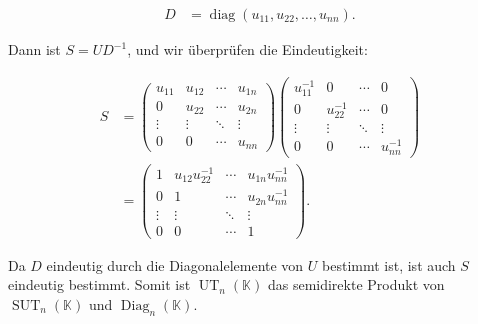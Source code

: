 \documentclass[11pt,a4paper]{article}
\begin{document}
\begin{align*}
D &= \operatorname{diag}(u_{11}, u_{22}, \ldots, u_{nn}).
\end{align*}

Dann ist $S = UD^{-1}$, und wir überprüfen die Eindeutigkeit:

\begin{align*}
S &= \begin{pmatrix}
u_{11} & u_{12} & \cdots & u_{1n} \\
0 & u_{22} & \cdots & u_{2n} \\
\vdots & \vdots & \ddots & \vdots \\
0 & 0 & \cdots & u_{nn}
\end{pmatrix}
\begin{pmatrix}
u_{11}^{-1} & 0 & \cdots & 0 \\
0 & u_{22}^{-1} & \cdots & 0 \\
\vdots & \vdots & \ddots & \vdots \\
0 & 0 & \cdots & u_{nn}^{-1}
\end{pmatrix} \\
&= \begin{pmatrix}
1 & u_{12} u_{22}^{-1} & \cdots & u_{1n} u_{nn}^{-1} \\
0 & 1 & \cdots & u_{2n} u_{nn}^{-1} \\
\vdots & \vdots & \ddots & \vdots \\
0 & 0 & \cdots & 1
\end{pmatrix}.
\end{align*}

Da $D$ eindeutig durch die Diagonalelemente von $U$ bestimmt ist, ist auch $S$ eindeutig bestimmt. Somit ist $\operatorname{UT}_n(\mathbb{K})$ das semidirekte Produkt von $\operatorname{SUT}_n(\mathbb{K})$ und $\operatorname{Diag}_n(\mathbb{K})$.

\end{document}
